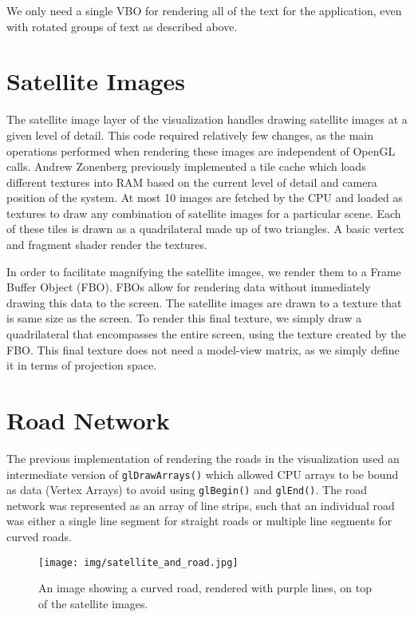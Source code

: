 We only need a single VBO for rendering all of the text for the application, even with rotated 
groups of text as described above.

\section{Satellite Images}
\label{section:satellite_images}

The satellite image layer of the visualization handles drawing satellite images at a given level of detail. 
This code required relatively few changes, as the main operations performed when rendering 
these images are independent of OpenGL calls. Andrew Zonenberg previously implemented a tile cache which loads different textures into RAM based on the current level of detail and camera position of the system. At most 10 images are fetched by the CPU and loaded as textures to draw any combination of satellite images for a particular scene. Each of these tiles is drawn as a quadrilateral made up of two triangles. A basic vertex and fragment shader render the textures.

In order to facilitate magnifying the satellite images, we render them to a Frame Buffer 
Object (FBO). FBOs allow for rendering data without immediately drawing this data to the screen. The satellite images are drawn to a texture that is same size as the screen. To render this final texture, we simply draw a quadrilateral that encompasses the entire screen, using the texture created by the FBO\@. 
This final texture does not need a model-view matrix, as we simply define it in terms of projection 
space.

\section{Road Network}
\label{section:road_network}

The previous implementation of rendering the roads in the visualization used an intermediate 
version of {\tt glDrawArrays()} which allowed CPU arrays to be bound as data (Vertex Arrays) to avoid using {\tt glBegin()} and {\tt glEnd()}. The road network was represented as an array of line strips, such that an individual road was either a single line segment for straight roads or multiple line segments for curved roads.

\begin{figure}[htp] \centering
    \texttt{[image: img/satellite\_and\_road.jpg]}
    \caption[Satellite Images and Roads]{An image showing a curved road, rendered with purple lines, on top of the satellite images.}
    \label{fig:satellite_and_road}
\end{figure}

